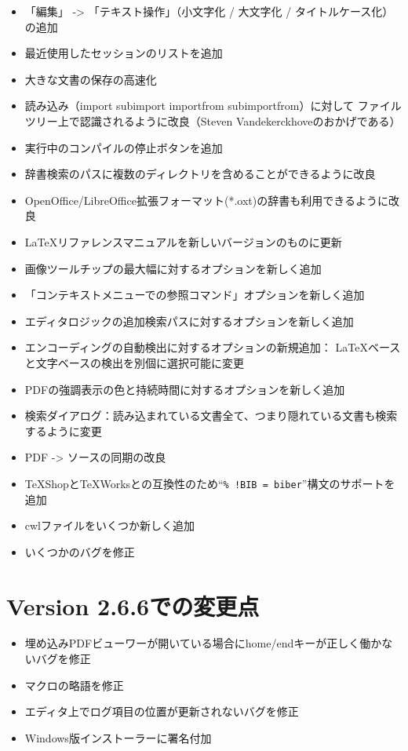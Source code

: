 \begin{itemize}
\item
  「編集」 -\textgreater{} 「テキスト操作」（小文字化 / 大文字化 / タイトルケース化）の追加
\item
  最近使用したセッションのリストを追加
\item
  大きな文書の保存の高速化
\item
  読み込み（import subimport importfrom subimportfrom）に対して
ファイルツリー上で認識されるように改良（Steven Vandekerckhoveのおかげである）
\item
  実行中のコンパイルの停止ボタンを追加
\item
  辞書検索のパスに複数のディレクトリを含めることができるように改良
\item
  OpenOffice/LibreOffice拡張フォーマット(*.oxt)の辞書も利用できるように改良
\item
  LaTeXリファレンスマニュアルを新しいバージョンのものに更新
\item
  画像ツールチップの最大幅に対するオプションを新しく追加
\item
  「コンテキストメニューでの参照コマンド」オプションを新しく追加
\item
  エディタロジックの追加検索パスに対するオプションを新しく追加
\item
  エンコーディングの自動検出に対するオプションの新規追加：
LaTeXベースと文字ベースの検出を別個に選択可能に変更
\item
  PDFの強調表示の色と持続時間に対するオプションを新しく追加
\item
  検索ダイアログ：読み込まれている文書全て、つまり隠れている文書も検索するように変更
\item
  PDF -\textgreater{} ソースの同期の改良
\item
  TeXShopとTeXWorksとの互換性のため``\verb+% !BIB = biber+''構文のサポートを追加
\item
  cwlファイルをいくつか新しく追加
\item
  いくつかのバグを修正
\end{itemize}

\section{Version 2.6.6での変更点}

\begin{itemize}
\item
  埋め込みPDFビューワーが開いている場合にhome/endキーが正しく働かないバグを修正
\item
  マクロの略語を修正
\item
  エディタ上でログ項目の位置が更新されないバグを修正
\item
  Windows版インストーラーに署名付加
\end{itemize}

